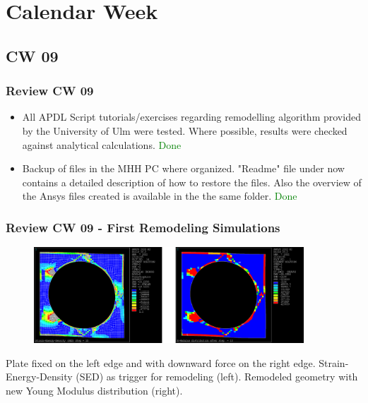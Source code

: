 \section{Calendar Week}
\subsection{CW 09}
\begin{frame}
  \frametitle{Review CW 09}
	\begin{itemize}
		\item All APDL Script tutorials/exercises regarding remodelling algorithm provided by the University of Ulm were tested. Where possible, results were checked against analytical calculations. \textcolor{green}{Done}
		\item Backup of files in the MHH PC where organized. "Readme" file under  now contains a detailed description of how to restore the files. Also the overview of the Ansys files created is available in the the same folder. \textcolor{green}{Done}
	\end{itemize}
\end{frame}

\begin{frame}
  \frametitle{Review CW 09 - First Remodeling Simulations}
	\begin{figure}
		\includegraphics[width=0.9\textwidth]{pictures/2022_CW09}
	\end{figure}
	\centering Plate fixed on the left edge and with downward force on the right edge.
	Strain-Energy-Density (SED) as trigger for remodeling (left). 
	Remodeled geometry with new Young Modulus distribution (right).
\end{frame}


